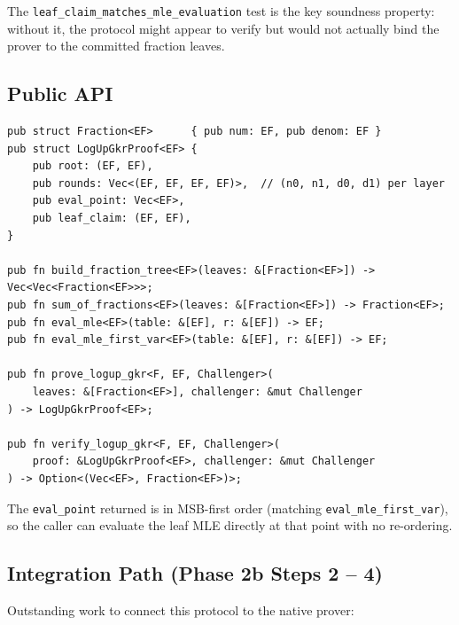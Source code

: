 The \texttt{leaf\_claim\_matches\_mle\_evaluation} test is the key
soundness property: without it, the protocol might appear to verify but
would not actually bind the prover to the committed fraction leaves.

\subsection{Public API}

\begin{verbatim}
pub struct Fraction<EF>      { pub num: EF, pub denom: EF }
pub struct LogUpGkrProof<EF> {
    pub root: (EF, EF),
    pub rounds: Vec<(EF, EF, EF, EF)>,  // (n0, n1, d0, d1) per layer
    pub eval_point: Vec<EF>,
    pub leaf_claim: (EF, EF),
}

pub fn build_fraction_tree<EF>(leaves: &[Fraction<EF>]) -> Vec<Vec<Fraction<EF>>>;
pub fn sum_of_fractions<EF>(leaves: &[Fraction<EF>]) -> Fraction<EF>;
pub fn eval_mle<EF>(table: &[EF], r: &[EF]) -> EF;
pub fn eval_mle_first_var<EF>(table: &[EF], r: &[EF]) -> EF;

pub fn prove_logup_gkr<F, EF, Challenger>(
    leaves: &[Fraction<EF>], challenger: &mut Challenger
) -> LogUpGkrProof<EF>;

pub fn verify_logup_gkr<F, EF, Challenger>(
    proof: &LogUpGkrProof<EF>, challenger: &mut Challenger
) -> Option<(Vec<EF>, Fraction<EF>)>;
\end{verbatim}

The \texttt{eval\_point} returned is in MSB-first order (matching
\texttt{eval\_mle\_first\_var}), so the caller can evaluate the leaf MLE
directly at that point with no re-ordering.

\subsection{Integration Path (Phase 2b Steps 2 -- 4)}

Outstanding work to connect this protocol to the native prover:

